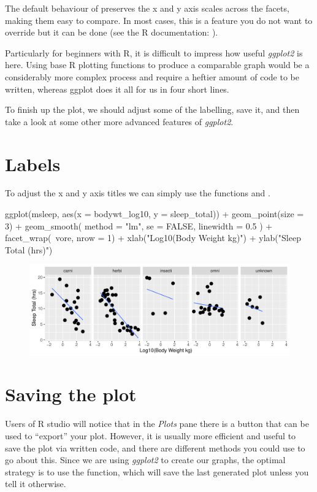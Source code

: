 The default behaviour of  preserves the x and y axis scales across the facets, making them easy to compare. In most cases, this is a feature you do not want to override but it can be done (see the R documentation: ).

Particularly for beginners with R, it is difficult to impress how useful \textit{ggplot2} is here. Using base R plotting functions to produce a comparable graph would be a considerably more complex process and require a heftier amount of code to be written, whereas ggplot does it all for us in four short lines.

To finish up the plot, we should adjust some of the labelling, save it, and then take a look at some other more advanced features of \textit{ggplot2}.

\section{Labels}

To adjust the x and y axis titles we can simply use the functions  and .

\begin{inR}
ggplot(msleep, aes(x = bodywt_log10, y = sleep_total)) +
  geom_point(size = 3) +
  geom_smooth(
    method = "lm",
    se = FALSE,
    linewidth = 0.5
  ) +
  facet_wrap(~vore, nrow = 1) +
  xlab("Log10(Body Weight kg)") + 
  ylab("Sleep Total (hrs)")
\end{inR}

\vspace{2em}

\begin{figure}[H]
\includegraphics[scale = .75]{graphics/ch2Figs/ggEx_16.pdf}
\end{figure}

\section{Saving the plot}

Users of R studio will notice that in the \textit{Plots} pane there is a button that can be used to ``export'' your plot. However, it is usually more efficient and useful to save the plot via written code, and there are different methods you could use to go about this.  Since we are using \textit{ggplot2} to create our graphs, the optimal strategy is to use the  function, which will save the last generated plot unless you tell it otherwise.

